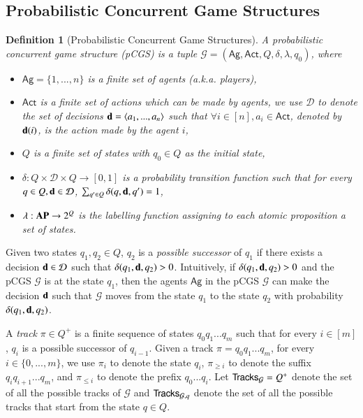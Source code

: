 \documentclass[letterpaper]{article}
\newcommand{\AP}{{\bf AP}}
\newcommand{\calM}{\mathcal{G}}
\newcommand{\calD}{\mathcal{D}}
\newcommand{\calT}{{\sf Tracks}}
\newcommand{\Ag}{\textsf{Ag}}
\newcommand{\Act}{\textsf{Act}}
\newcommand{\dec}{{\bf d}}
\newtheorem{definition}{Definition}
\begin{document}
\subsection{Probabilistic Concurrent Game Structures}
\begin{definition}[Probabilistic Concurrent Game Structures]
A \emph{probabilistic concurrent game structure} (pCGS) is a tuple $\calM=(\Ag,\Act, Q, \delta,\lambda,q_0)$, where
\begin{itemize}
  \item $\Ag=\{1,...,n\}$ is a finite set of \emph{agents} (a.k.a. players),
  \item $\Act$ is a finite set of \emph{actions} which can be made by agents, we use $\calD$ to denote the set of \emph{decisions} $\dec=\langle a_1,...,a_n\rangle$ such that $\forall i\in [n], a_i\in \Act$, denoted by $\dec(i)$, is the action made by the agent $i$,
  \item $Q$ is a finite set of \emph{states} with $q_0\in Q$ as the initial state,
  \item $\delta:Q\times \calD\times Q\rightarrow [0,1]$ is a \emph{probability transition function} such that for every $q\in Q,\dec\in\calD$, $\sum_{q'\in Q}\delta(q,\dec,q')=1$,
  \item $\lambda:\AP\rightarrow 2^{Q}$ is the \emph{labelling function} assigning to each atomic proposition a set of states.
\end{itemize}
\end{definition}

Given two states $q_1,q_2\in Q$, $q_2$ is a \emph{possible successor} of $q_1$ if there exists a decision $\dec\in\calD$ such that $\delta(q_1,\dec,q_2)>0$.
Intuitively, if $\delta(q_1,\dec,q_2)>0$ and the pCGS $\calM$ is at the state $q_1$, then the agents $\Ag$ in the pCGS $\calM$ can make the decision $\dec$ such that $\calM$ moves from the state $q_1$ to the state $q_2$
with probability $\delta(q_1,\dec,q_2)$.

A \emph{track} $\pi\in Q^+$ is a finite sequence of states $q_0q_1...q_m$ such that for every $i\in[m]$, $q_i$ is a possible successor of $q_{i-1}$. Given a track $\pi=q_0q_1...q_m$, for every $i\in\{0,...,m\}$, we use $\pi_i$ to denote the state $q_i$, $\pi_{\geq i}$ to denote the suffix $q_iq_{i+1}...q_m$, and $\pi_{\leq i}$ to denote the prefix $q_0...q_{i}$.
Let $\calT_\calM=Q^+$ denote the set of all the possible tracks
of $\calM$ and $\calT_{\calM,q}$ denote the set of all the possible tracks that start from the state $q\in Q$.
\end{document}
